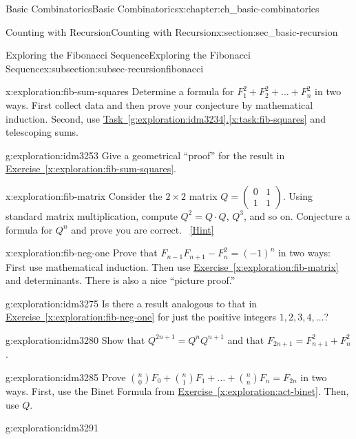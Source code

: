 \documentclass[oneside,10pt,]{book}
\numberwithin{equation}{chapter}
\newcommand{\amp}{&}
\begin{document}
\begin{chapterptx}{Basic Combinatorics}{}{Basic Combinatorics}{}{}{x:chapter:ch_basic-combinatorics}
\begin{sectionptx}{Counting with Recursion}{}{Counting with Recursion}{}{}{x:section:sec_basic-recursion}
\begin{subsectionptx}{Exploring the Fibonacci Sequence}{}{Exploring the Fibonacci Sequence}{}{}{x:subsection:subsec-recursionfibonacci}
\begin{exploration}{}{x:exploration:fib-sum-squares}
Determine a formula for \(F_{1}^{2} + F_{2}^{2} + \ldots + F_{n}^{2}\) in two ways.  First collect data and then prove your conjecture by mathematical induction.  Second, use \hyperref[x:task:fib-squares]{Task~\ref{g:exploration:idm3234}.\ref{x:task:fib-squares}} and telescoping sums.%
\end{exploration}
\begin{exploration}{}{g:exploration:idm3253}%
Give a geometrical ``proof'' for the result in \hyperref[x:exploration:fib-sum-squares]{Exercise~\ref{x:exploration:fib-sum-squares}}.%
\end{exploration}
\begin{exploration}{}{x:exploration:fib-matrix}%
Consider the \(2\times 2\) matrix \(Q =
\begin{pmatrix}
0 \amp 1\\
1 \amp 1
\end{pmatrix}.\) Using standard matrix multiplication, compute \(Q^2 = Q\cdot Q\), \(Q^3\), and so on.  Conjecture a formula for \(Q^n\) and prove you are correct.%
\qquad~\hfill{\tiny\hyperlink{g:hint:idm3266-back}{[Hint]}}\end{exploration}
\begin{exploration}{}{x:exploration:fib-neg-one}%
Prove that \(F_{n - 1}F_{n + 1} - F_{n}^{2} = (-1)^{n}\) in two ways:  First use mathematical induction.  Then use \hyperref[x:exploration:fib-matrix]{Exercise~\ref{x:exploration:fib-matrix}} and determinants.  There is also a nice ``picture proof.''%
\end{exploration}
\begin{exploration}{}{g:exploration:idm3275}%
Is there a result analogous to that in \hyperref[x:exploration:fib-neg-one]{Exercise~\ref{x:exploration:fib-neg-one}} for just the positive integers \(1, 2, 3, 4, \ldots\)?%
\end{exploration}
\begin{exploration}{}{g:exploration:idm3280}%
Show that \(Q^{2n + 1} = Q^{n}Q^{n+1}\) and that \(F_{2n + 1} = F_{n + 1}^{2} + F_{n}^{2}\) .%
\end{exploration}
\begin{exploration}{}{g:exploration:idm3285}%
Prove \(\binom{n}{0}F_{0} + \binom{n}{1}F_{1} + \ldots + \binom{n}{n}F_{n} = F_{2n}\) in two ways.  First, use the Binet Formula from \hyperref[x:exploration:act-binet]{Exercise~\ref{x:exploration:act-binet}}.  Then, use \(Q\).%
\end{exploration}
\begin{exploration}{}{g:exploration:idm3291}%

\end{exploration}
\end{subsectionptx}
\end{sectionptx}
\end{chapterptx}
\end{document}
